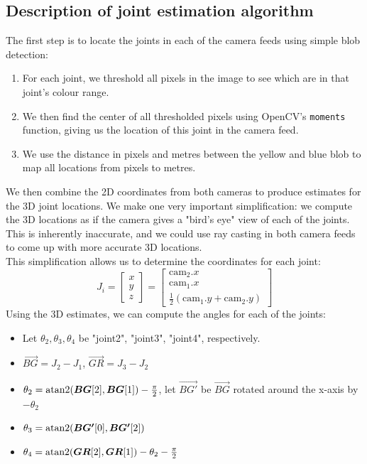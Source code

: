 
\subsection{Description of joint estimation algorithm} \label{joint_algo}
The first step is to locate the joints in each of the camera feeds using
simple blob detection:
\begin{enumerate}
    \item
        For each joint, we threshold all pixels in the image to see
        which are in that joint's colour range.
    \item
        We then find the center of all thresholded pixels using
        OpenCV's \texttt{moments} function, giving us the location
        of this joint in the camera feed.
    \item
        We use the distance in pixels and metres between the yellow
        and blue blob to map all locations from pixels to metres.
\end{enumerate}
We then combine the 2D coordinates from both cameras to produce
estimates for the 3D joint locations. We make one very important
simplification: we compute the 3D locations as if the camera
gives a "bird's eye" view of each of the joints.
This is inherently inaccurate, and we could use ray casting in both camera feeds
to come up with more accurate 3D locations.\\
This simplification allows us to determine the coordinates for each joint:
\[ 
    J_i = \begin{bmatrix} x \\ y \\ z \end{bmatrix} =
    \begin{bmatrix} 
        \text{cam}_2.x \\
        \text{cam}_1.x \\
        \frac{1}{2} (\text{cam}_1.y + \text{cam}_2.y)
    \end{bmatrix} 
\]
Using the 3D estimates, we can compute the angles for each of the joints:
\begin{itemize}
    \item
        Let $\theta_2, \theta_3, \theta_4$ be
        "joint2", "joint3", "joint4", respectively.
    \item $\vec{BG} = J_2 - J_1$, $\vec{GR} = J_3 - J_2$
    \item $\theta_2 = \operatorname{atan2}(\bm{BG}[2], \bm{BG}[1]) - \frac{\pi}{2}$,
        let $\vec{BG'}$ be $\vec{BG}$ rotated around the x-axis by $-\theta_2$
    \item $\theta_3 = \operatorname{atan2}(\bm{BG'}[0], \bm{BG'}[2])$
    \item $\theta_4 = \operatorname{atan2}(\bm{GR}[2],\bm{GR}[1]) - \theta_2 - \frac{\pi}{2}$
\end{itemize}


